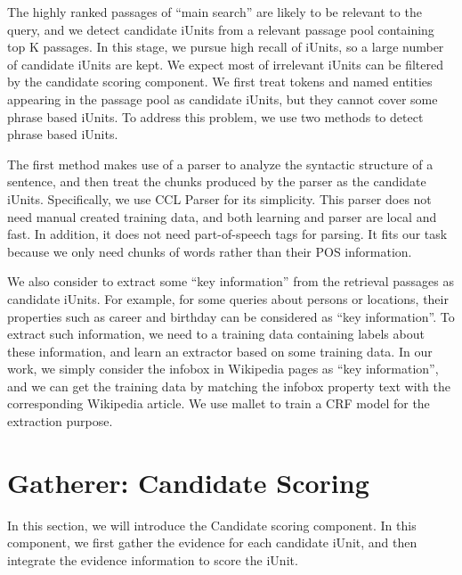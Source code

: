 \documentclass{llncs}
\begin{document}
The highly ranked passages of ``main search''  are likely to be relevant to the query, and we detect candidate iUnits from a relevant passage pool containing top K passages.
In this stage, we pursue high recall of iUnits, so a large number of candidate iUnits are kept.
We expect most of irrelevant iUnits can be filtered by the candidate scoring component.
We first treat tokens and named entities appearing in the passage pool as candidate iUnits, but they cannot cover some phrase based iUnits.
To address this problem, we use two methods to detect phrase based iUnits.

The first method makes use of a parser to analyze the syntactic structure of a sentence, and then treat the chunks produced by the parser as the candidate iUnits.
Specifically, we use CCL Parser \cite{seginer_etal_ACL07} for its simplicity. This parser does not need manual created training data, and both learning and parser are local and fast. In addition, it does not need part-of-speech tags for parsing. It fits our task because we only need chunks of words rather than their POS information.

We also consider to extract some ``key information'' from the retrieval passages as candidate iUnits.
For example, for some queries about persons or locations, their properties such as career and birthday can be considered as ``key information''.
To extract such information, we need to a training data containing labels about these information, and learn an extractor based on some training data.
In our work, we simply consider the infobox in Wikipedia pages as ``key information'', and we can get the training data by matching the infobox property text with the corresponding Wikipedia article.
We use mallet \cite{mccallum_02} to train a CRF model \cite{Lafferty_etal_ICML01} for the extraction purpose.

\section{Gatherer: Candidate Scoring}
In this section, we will introduce the Candidate scoring component.
In this component, we first gather the evidence for each candidate iUnit, and then integrate the evidence information to score the iUnit.
\end{document}
